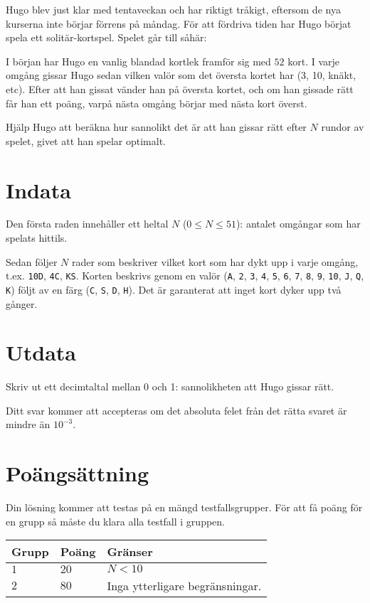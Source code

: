 Hugo blev just klar med tentaveckan och har riktigt tråkigt, eftersom de nya kurserna inte börjar förrens på måndag.
För att fördriva tiden har Hugo börjat spela ett solitär-kortspel. Spelet går till såhär:

I början har Hugo en vanlig blandad kortlek framför sig med $52$ kort. I varje omgång gissar Hugo sedan vilken valör som det översta kortet har (3, 10, knäkt, etc).
Efter att han gissat vänder han på översta kortet, och om han gissade rätt får han ett poäng, varpå nästa omgång börjar med nästa kort överst.

Hjälp Hugo att beräkna hur sannolikt det är att han gissar rätt efter $N$ rundor av spelet, givet att han spelar optimalt.

\section*{Indata}
Den första raden innehåller ett heltal $N$ ($0 \le N \le 51$): antalet omgångar som har spelats hittils.

Sedan följer $N$ rader som beskriver vilket kort som har dykt upp i varje omgång, t.ex. \texttt{10D}, \texttt{4C}, \texttt{KS}.
Korten beskrivs genom en valör (\texttt{A}, \texttt{2}, \texttt{3}, \texttt{4}, \texttt{5}, \texttt{6}, \texttt{7}, \texttt{8},
\texttt{9}, \texttt{10}, \texttt{J}, \texttt{Q}, \texttt{K}) följt av en färg (\texttt{C}, \texttt{S}, \texttt{D}, \texttt{H}).
Det är garanterat att inget kort dyker upp två gånger.

\section*{Utdata}
Skriv ut ett decimtaltal mellan 0 och 1: sannolikheten att Hugo gissar rätt.

Ditt svar kommer att accepteras om det absoluta felet från det rätta svaret är mindre än $10^{-3}$.

\section*{Poängsättning}
Din lösning kommer att testas på en mängd testfallsgrupper.
För att få poäng för en grupp så måste du klara alla testfall i gruppen.

\noindent
\begin{tabular}{| l | l | p{12cm} |}
  \hline
  \textbf{Grupp} & \textbf{Poäng} & \textbf{Gränser} \\ \hline
  $1$    & $20$       & $N < 10$ \\ \hline
  $2$    & $80$       & Inga ytterligare begränsningar. \\ \hline
\end{tabular}
